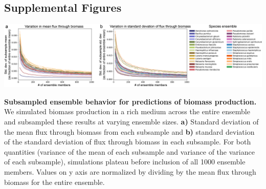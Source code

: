 \documentclass[11pt,onecolumn,notitlepage,openany,twoside]{book}
\begin{document}
\begin{refsection}
\printbibliography[heading=none]

\section{Supplemental Figures}

\begin{suppfigure*}
\centering
\includegraphics[width=\textwidth]{ch3_figS1}
\caption[ Subsampled ensemble behavior for predictions of biomass production.]{\textbf{ Subsampled ensemble behavior for predictions of biomass production.} We simulated biomass production in a rich medium across the entire ensemble and subsampled these results at varying ensemble sizes. \textbf{a)} Standard deviation of the mean flux through biomass from each subsample and \textbf{b)} standard deviation of the standard deviation of flux through biomass in each subsample. For both quantities (variance of the mean of each subsample and variance of the variance of each subsample), simulations plateau before inclusion of all 1000 ensemble members. Values on y axis are normalized by dividing by the mean flux through biomass for the entire ensemble.}
\end{suppfigure*}

\end{refsection}

\end{document}
